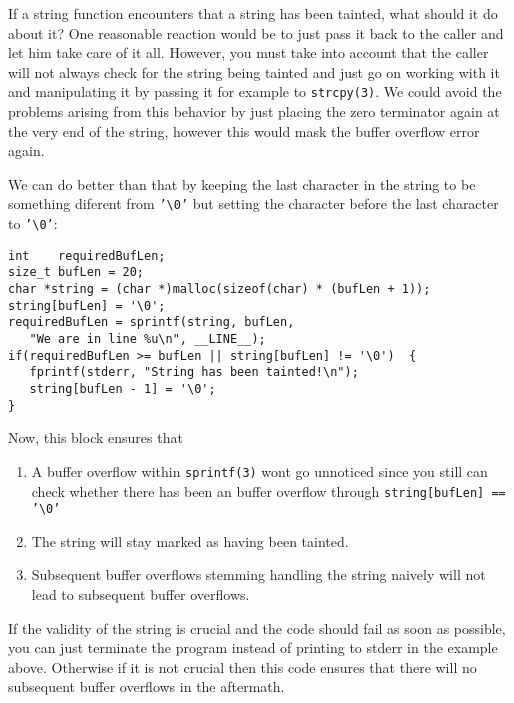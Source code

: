 If a string function encounters that a string has been tainted, what should it 
do about it?
One reasonable reaction would be to just pass it back to the caller and let
him take care of it all.
However, you must take into account that the caller will not always check for
the string being tainted and just go on working with it and manipulating it by
passing it for example to \texttt{strcpy(3)}.
We could avoid the problems arising from this behavior by just placing 
the zero terminator again at the very end of the string, however this would mask
the buffer overflow error again.

We can do better than that by keeping the last character in the string to 
be something diferent from \texttt{'\textbackslash0'} but setting the character
before the last character to \texttt{'\textbackslash0'}:

\begin{lstlisting}
int    requiredBufLen;
size_t bufLen = 20;
char *string = (char *)malloc(sizeof(char) * (bufLen + 1));
string[bufLen] = '\0';
requiredBufLen = sprintf(string, bufLen, 
   "We are in line %u\n", __LINE__);
if(requiredBufLen >= bufLen || string[bufLen] != '\0')  {
   fprintf(stderr, "String has been tainted!\n");
   string[bufLen - 1] = '\0';
}
\end{lstlisting}

Now, this block ensures that
\begin{enumerate}
\item A buffer overflow within \texttt{sprintf(3)} wont go unnoticed since you 
still can check whether there has been an buffer overflow through 
\texttt{string[bufLen] == '\textbackslash0'}
\item The string will stay marked as having been tainted.
\item Subsequent buffer overflows stemming handling the string naively 
will not lead to subsequent buffer overflows. 
\end{enumerate}

If the validity of the string is crucial and the code should fail as soon as 
possible, you can just terminate the program instead of printing to stderr in 
the example above. Otherwise if it is not crucial then this code ensures that 
there will no subsequent buffer overflows in the aftermath.

\lstset{language=Lisp}  
